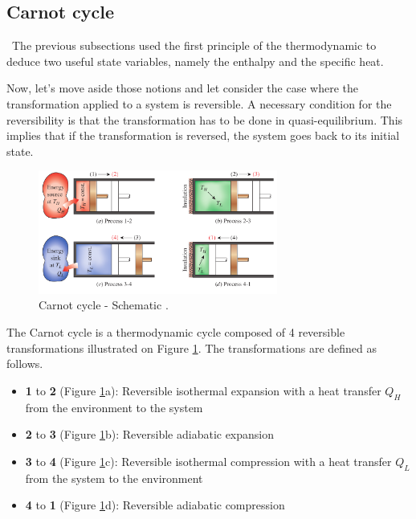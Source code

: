 \subsection{Carnot cycle}
\quad\, The previous subsections used the first principle of the thermodynamic to deduce two useful state variables, namely the enthalpy and the specific heat.

Now, let's move aside those notions and let consider the case where the transformation applied to a system is reversible. A necessary condition for the reversibility is that the transformation has to be done in quasi-equilibrium. This implies that if the transformation is reversed, the system goes back to its initial state.


\begin{figure}[h]
\centering
\includegraphics[width=0.7\textwidth]{Carnot_schema.png}
\caption{Carnot cycle - Schematic \cite{2015}.}
\label{fig:C2_5_Carnot}
\end{figure}
The Carnot cycle is a thermodynamic cycle composed of 4 reversible transformations illustrated on Figure \ref{fig:C2_5_Carnot}. The transformations are defined as follows.

\begin{itemize}
\item \textbf{1} to \textbf{2} (Figure \ref{fig:C2_5_Carnot}a): Reversible isothermal expansion with a heat transfer $Q_H$ from the environment to the system
\item \textbf{2} to \textbf{3} (Figure \ref{fig:C2_5_Carnot}b): Reversible  adiabatic expansion
\item \textbf{3} to \textbf{4} (Figure \ref{fig:C2_5_Carnot}c): Reversible isothermal compression with a heat transfer $Q_L$ from the system to the environment
\item \textbf{4} to \textbf{1} (Figure \ref{fig:C2_5_Carnot}d): Reversible adiabatic compression
\end{itemize}

